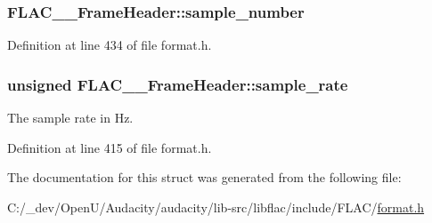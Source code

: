 \subsubsection[{\texorpdfstring{sample\+\_\+number}{sample_number}}]{ F\+L\+A\+C\+\_\+\+\_\+\+Frame\+Header\+::sample\+\_\+number}\hypertarget{struct_f_l_a_c_____frame_header_a4bbe555be68bd9fa48a22624233ee9f0}{}\label{struct_f_l_a_c_____frame_header_a4bbe555be68bd9fa48a22624233ee9f0}


Definition at line 434 of file format.\+h.

\subsubsection[{\texorpdfstring{sample\+\_\+rate}{sample_rate}}]{\setlength{\rightskip}{0pt plus 5cm}unsigned F\+L\+A\+C\+\_\+\+\_\+\+Frame\+Header\+::sample\+\_\+rate}\hypertarget{struct_f_l_a_c_____frame_header_acc23daa576f4e75885bf4f2b69cee1be}{}\label{struct_f_l_a_c_____frame_header_acc23daa576f4e75885bf4f2b69cee1be}
The sample rate in Hz. 

Definition at line 415 of file format.\+h.



The documentation for this struct was generated from the following file\+:\begin{DoxyCompactItemize}
\item 
C\+:/\+\_\+dev/\+Open\+U/\+Audacity/audacity/lib-\/src/libflac/include/\+F\+L\+A\+C/\hyperlink{include_2_f_l_a_c_2format_8h}{format.\+h}\end{DoxyCompactItemize}
